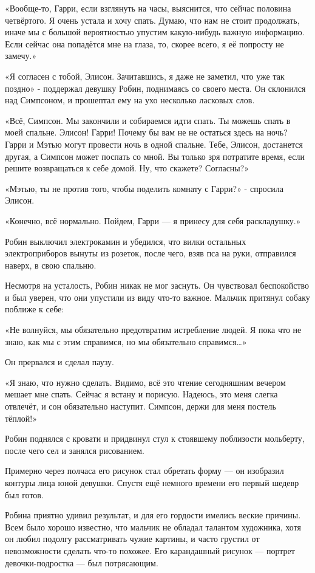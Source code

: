\documentclass[a5paper, 9pt,
final, openany, twoside=true]{memoir}
\begin{document}
«Вообще-то, Гарри, если взглянуть на часы, выяснится, что сейчас половина четвёртого. Я очень устала и хочу спать. Думаю, что нам не стоит продолжать, иначе мы с большой вероятностью упустим какую-нибудь важную информацию. Если сейчас она попадётся мне на глаза, то, скорее всего, я её попросту не замечу.»

«Я согласен с тобой, Элисон. Зачитавшись, я даже не заметил, что уже так поздно» - поддержал девушку Робин, поднимаясь со своего места. Он склонился над Симпсоном, и прошептал ему на ухо несколько ласковых слов.

«Всё, Симпсон. Мы закончили и собираемся идти спать. Ты можешь спать в моей спальне. Элисон! Гарри! Почему бы вам не не остаться здесь на ночь? Гарри и Мэтью могут провести ночь в одной спальне. Тебе, Элисон, достанется другая, а Симпсон может поспать со мной. Вы только зря потратите время, если решите возвращаться к себе домой. Ну, что скажете? Согласны?»

«Мэтью, ты не против того, чтобы поделить комнату с Гарри?» - спросила Элисон.

«Конечно, всё нормально. Пойдем, Гарри — я принесу для себя раскладушку.»

Робин выключил электрокамин и убедился, что вилки остальных электроприборов вынуты из розеток, после чего, взяв пса на руки, отправился наверх, в свою спальню.\bigskip

Несмотря на усталость, Робин никак не мог заснуть. Он чувствовал беспокойство и был уверен, что они упустили из виду что-то важное. Мальчик притянул собаку поближе к себе:

«Не волнуйся, мы обязательно предотвратим истребление людей. Я пока что не знаю, как мы с этим справимся, но мы обязательно справимся…»

Он прервался и сделал паузу.

«Я знаю, что нужно сделать. Видимо, всё это чтение сегодняшним вечером мешает мне спать. Сейчас я встану и порисую. Надеюсь, это меня слегка отвлечёт, и сон обязательно наступит. Симпсон, держи для меня постель тёплой!»\bigskip

Робин поднялся с кровати и придвинул стул к стоявшему поблизости мольберту, после чего сел и занялся рисованием.

Примерно через полчаса его рисунок стал обретать форму — он изобразил контуры лица юной девушки. Спустя ещё немного времени его первый шедевр был готов.

Робина приятно удивил результат, и для его гордости имелись веские причины. Всем было хорошо известно, что мальчик не обладал талантом художника, хотя он любил подолгу рассматривать чужие картины, и часто грустил от невозможности сделать что-то похожее. Его карандашный рисунок — портрет девочки-подростка — был потрясающим.
\end{document}
